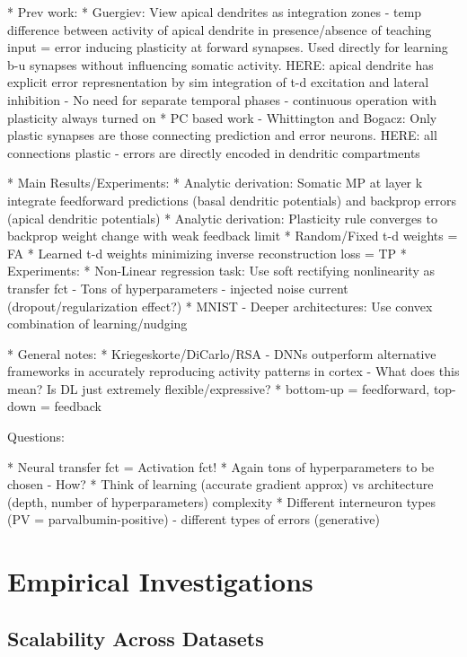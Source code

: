 \documentclass{article}
\theoremstyle{definition}
\begin{document}
* Prev work:
    * Guergiev: View apical dendrites as integration zones - temp difference between activity of apical dendrite in presence/absence of teaching input = error inducing plasticity at forward synapses. Used directly for learning b-u synapses without influencing somatic activity. HERE: apical dendrite has explicit error represnentation by sim integration of t-d excitation and lateral inhibition - No need for separate temporal phases - continuous operation with plasticity always turned on
    * PC based work - Whittington and Bogacz: Only plastic synapses are those connecting prediction and error neurons. HERE: all connections plastic - errors are directly encoded in dendritic compartments

* Main Results/Experiments:
    * Analytic derivation: Somatic MP at layer k integrate feedforward predictions (basal dendritic potentials) and backprop errors (apical dendritic potentials)
    * Analytic derivation: Plasticity rule converges to backprop weight change with weak feedback limit
    * Random/Fixed t-d weights = FA
    * Learned t-d weights minimizing inverse reconstruction loss = TP
    * Experiments:
        * Non-Linear regression task: Use soft rectifying nonlinearity as transfer fct - Tons of hyperparameters - injected noise current (dropout/regularization effect?)
        * MNIST - Deeper architectures: Use convex combination of learning/nudging

* General notes:
    * Kriegeskorte/DiCarlo/RSA - DNNs outperform alternative frameworks in accurately reproducing activity patterns in cortex - What does this mean? Is DL just extremely flexible/expressive?
    * bottom-up = feedforward, top-down = feedback


Questions:

* Neural transfer fct = Activation fct!
* Again tons of hyperparameters to be chosen - How?
* Think of learning (accurate gradient approx) vs architecture (depth, number of hyperparameters) complexity
* Different interneuron types (PV = parvalbumin-positive) - different types of errors (generative)


\newpage
\section{Empirical Investigations}

\subsection*{Scalability Across Datasets}
\end{document}
